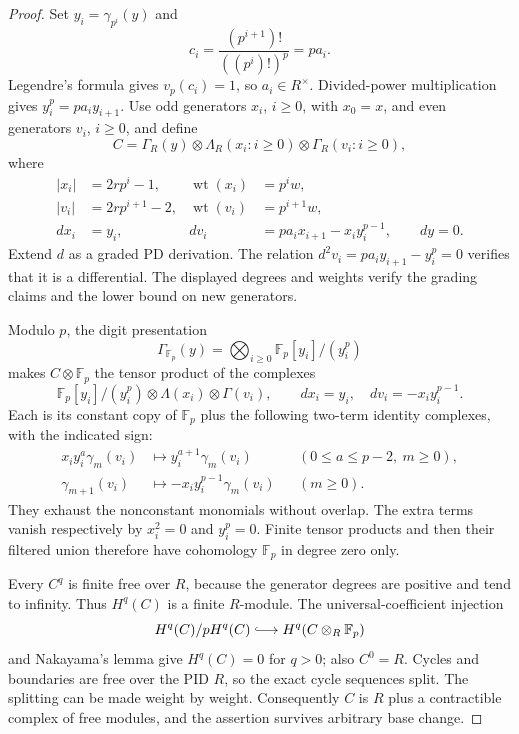 \begin{proof}
Set $y_i=\gamma_{p^i}(y)$ and
\[
 c_i=\frac{(p^{i+1})!}{((p^i)!)^p}=p a_i.
\]
Legendre's formula gives $v_p(c_i)=1$, so $a_i\in R^\times$.
Divided-power multiplication gives $y_i^p=p a_i y_{i+1}$.
Use odd generators $x_i$, $i\geq0$, with $x_0=x$, and even
generators $v_i$, $i\geq0$, and define
\[
 C=\Gamma_R(y)\otimes\Lambda_R(x_i:i\geq0)
       \otimes\Gamma_R(v_i:i\geq0),
\]
where
\begin{align*}
 |x_i|&=2rp^i-1,&\operatorname{wt}(x_i)&=p^iw,\\
 |v_i|&=2rp^{i+1}-2,&\operatorname{wt}(v_i)&=p^{i+1}w,\\
 dx_i&=y_i,&dv_i&=p a_i x_{i+1}-x_i y_i^{p-1},\qquad dy=0.
\end{align*}
Extend $d$ as a graded PD derivation. The relation
$d^2v_i=p a_i y_{i+1}-y_i^p=0$ verifies that it is a
differential. The displayed degrees and weights verify the grading
claims and the lower bound on new generators.

Modulo $p$, the digit presentation
\[
 \Gamma_{\mathbb F_p}(y)
 =\bigotimes_{i\geq0}\mathbb F_p[y_i]/(y_i^p)
\]
makes $C\otimes\mathbb F_p$ the tensor product of the complexes
\[
 \mathbb F_p[y_i]/(y_i^p)\otimes\Lambda(x_i)\otimes\Gamma(v_i),
 \qquad dx_i=y_i,\quad dv_i=-x_i y_i^{p-1}.
\]
Each is its constant copy of $\mathbb F_p$ plus the following
two-term identity complexes, with the indicated sign:
\begin{align*}
 x_i y_i^a\gamma_m(v_i)&\longmapsto
       y_i^{a+1}\gamma_m(v_i)
       &&(0\leq a\leq p-2,\ m\geq0),\\
 \gamma_{m+1}(v_i)&\longmapsto
       -x_i y_i^{p-1}\gamma_m(v_i)
       &&(m\geq0).
\end{align*}
They exhaust the nonconstant monomials without overlap. The extra
terms vanish respectively by $x_i^2=0$ and $y_i^p=0$.
Finite tensor products and then their filtered union therefore have
cohomology $\mathbb F_p$ in degree zero only.

Every $C^q$ is finite free over $R$, because the generator degrees
are positive and tend to infinity. Thus $H^q(C)$ is a finite
$R$-module. The universal-coefficient injection
\[
 H^q(C)/pH^q(C)\lhook\joinrel\longrightarrow
 H^q(C\otimes_R\mathbb F_p)
\]
and Nakayama's lemma give $H^q(C)=0$ for $q>0$; also $C^0=R$.
Cycles and boundaries are free over the PID $R$, so the exact
cycle sequences split. The splitting can be made weight by weight.
Consequently $C$ is $R$ plus a contractible complex of free modules,
and the assertion survives arbitrary base change.


\end{proof}
